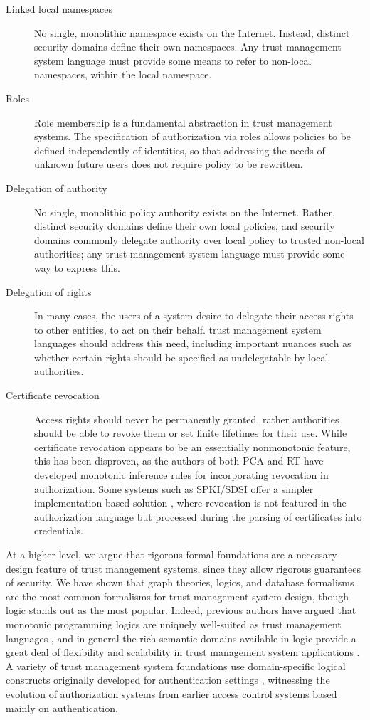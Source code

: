 \begin{description}
\item[Linked local namespaces] No single, monolithic namespace
exists on the Internet.  Instead, distinct security domains 
define their own namespaces.  Any trust management system language must provide some means
to refer to non-local namespaces, within the local namespace.
\item[Roles] Role membership is a fundamental abstraction
in trust management systems.  The specification of authorization via roles allows
policies to be defined independently of identities, so that 
addressing the needs of unknown future users does not require
policy to be rewritten.
\item[Delegation of authority] No single, monolithic policy authority
exists on the Internet.  Rather, distinct security domains define
their own local policies, and security domains commonly delegate
authority over local policy to trusted non-local authorities; any trust management system
language must provide some way to express this.
\item[Delegation of rights] In many cases, the users of a system 
desire to delegate their access rights to other entities, to 
act on their behalf.  trust management system languages should address this need,
including important nuances such as whether certain rights
should be specified as undelegatable by local authorities.
\item[Certificate revocation] Access rights should never be
permanently granted, rather authorities should be able to revoke them
or set finite lifetimes for their use.  While certificate revocation
appears to be an essentially nonmonotonic feature, this has been
disproven, as the authors of both PCA \cite{Bauer:ACWPCA} and RT
\cite{lbi-fc01} have developed monotonic inference rules for
incorporating revocation in authorization.  Some systems such as
SPKI/SDSI offer a simpler implementation-based solution
\cite{RFC-2693}, where revocation is not featured in the authorization
language but processed during the parsing of certificates into 
credentials.
\end{description}

At a higher level, we argue that rigorous formal foundations are a
necessary design feature of trust management systems, since they allow
rigorous guarantees of security.  We have shown that graph theories,
logics, and database formalisms are the most common formalisms for
trust management system design, though logic stands out as the most
popular.  Indeed, previous authors have argued that monotonic
programming logics are uniquely well-suited as trust management
languages \cite{Li:DCFTML}, and in general the rich semantic domains
available in logic provide a great deal of flexibility and scalability
in trust management system applications \cite{polakow-skalka-plas06}.
A variety of trust management system foundations use domain-specific
logical constructs originally developed for authentication settings
\cite{Burrows:LA}, witnessing the evolution of authorization systems
from earlier access control systems based mainly on authentication.

